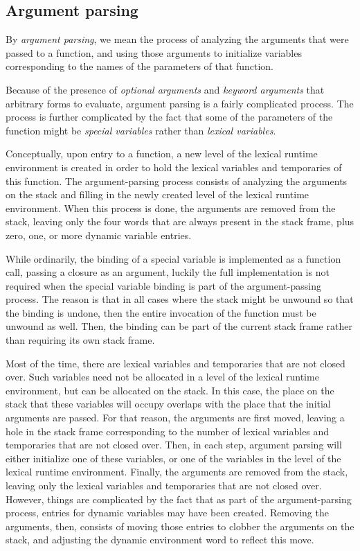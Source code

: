 \subsection{Argument parsing}

By \emph{argument parsing}, we mean the process of analyzing the
arguments that were passed to a function, and using those arguments to
initialize variables corresponding to the names of the parameters of
that function.

Because of the presence of \emph{optional arguments} and \emph{keyword
  arguments} that arbitrary forms to evaluate, argument parsing is a
fairly complicated process.  The process is further complicated by the
fact that some of the parameters of the function might be
\emph{special variables} rather than \emph{lexical variables}.  

Conceptually, upon entry to a function, a new level of the lexical
runtime environment is created in order to hold the lexical variables
and temporaries of this function.  The argument-parsing process
consists of analyzing the arguments on the stack and filling in the
newly created level of the lexical runtime environment.  When this
process is done, the arguments are removed from the stack, leaving
only the four words that are always present in the stack frame, plus
zero, one, or more dynamic variable entries.

While ordinarily, the binding of a special variable is implemented as
a function call, passing a closure as an argument, luckily the full
implementation is not required when the special variable binding is
part of the argument-passing process.  The reason is that in all cases
where the stack might be unwound so that the binding is undone, then
the entire invocation of the function must be unwound as well.  Then,
the binding can be part of the current stack frame rather than
requiring its own stack frame. 

Most of the time, there are lexical variables and temporaries that are
not closed over.  Such variables need not be allocated in a level of
the lexical runtime environment, but can be allocated on the stack.
In this case, the place on the stack that these variables will occupy
overlaps with the place that the initial arguments are passed.  For
that reason, the arguments are first moved, leaving a hole in the
stack frame corresponding to the number of lexical variables and
temporaries that are not closed over.  Then, in each step, argument
parsing will either initialize one of these variables, or one of the
variables in the level of the lexical runtime environment.  Finally,
the arguments are removed from the stack, leaving only the lexical
variables and temporaries that are not closed over.  However, things
are complicated by the fact that as part of the argument-parsing
process, entries for dynamic variables may have been created.
Removing the arguments, then, consists of moving those entries to
clobber the arguments on the stack, and adjusting the dynamic
environment word to reflect this move. 

